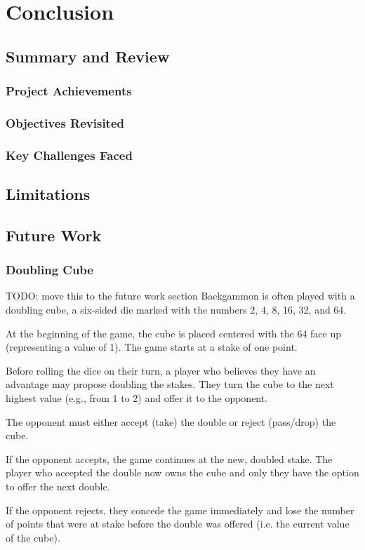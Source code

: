 

\chapter{Conclusion}
\section{Summary and Review}
\subsection{Project Achievements}
\subsection{Objectives Revisited}
\subsection{Key Challenges Faced}
\section{Limitations}
\section{Future Work}

\subsection{Doubling Cube}
TODO: move this to the future work section
Backgammon is often played with a doubling cube, a six-sided die marked with the numbers 2, 4, 8, 16, 32, and 64.

At the beginning of the game, the cube is placed centered with the 64 face up (representing a value of 1). The game starts at a stake of one point.

Before rolling the dice on their turn, a player who believes they have an advantage may propose doubling the stakes. 
They turn the cube to the next highest value (e.g., from 1 to 2) and offer it to the opponent.

The opponent must either accept (take) the double or reject (pass/drop) the cube.

If the opponent accepts, the game continues at the new, doubled stake. The player who accepted the double now owns the cube and only they have the option to offer the next double.

If the opponent rejects, they concede the game immediately and lose the number of points that were at stake before the double was offered (i.e. the current value of the cube).

